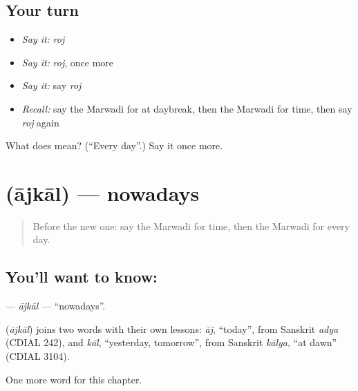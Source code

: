 \subsection*{Your turn}
\begin{itemize}
\raggedright
  \item \emph{Say it:} \emph{roj}
  \item \emph{Say it:} \emph{roj}, once more
  \item \emph{Say it:} say \emph{roj}
  \item \emph{Recall:} say the Marwadi for at daybreak, then the Marwadi for time, then say \emph{roj} again
\end{itemize}

\begin{tcolorbox}[breakable,colback=teal!4,colframe=teal!35!black,title={Before you move on}]
What does  mean? (\textquotedblleft{}Every day\textquotedblright{}.) Say it once more.
\end{tcolorbox}
\section[\texorpdfstring{\mw{आजकाल} (ājkāl)}{आजकाल (ājkāl)}]{ (ājkāl) — nowadays}

\label{lesson:MW-C95-ajkal}



\begin{quote}
Before the new one: say the Marwadi for time, then the Marwadi for every day.
\end{quote}

\subsection*{You'll want to know: }
\textbf{} — \emph{ājkāl} — \textquotedblleft{}nowadays\textquotedblright{}.

\begin{cousinweb}
\textbf{} (\emph{ājkāl}) joins two words with their own lessons: \emph{āj}, \textquotedblleft{}today\textquotedblright{}, from Sanskrit \emph{adya} (CDIAL 242), and \emph{kāl}, \textquotedblleft{}yesterday, tomorrow\textquotedblright{}, from Sanskrit \emph{kālya}, \textquotedblleft{}at dawn\textquotedblright{} (CDIAL 3104).
\end{cousinweb}

\begin{grammarlens}[title={What you've built}]
One more word for this chapter.
\end{grammarlens}

